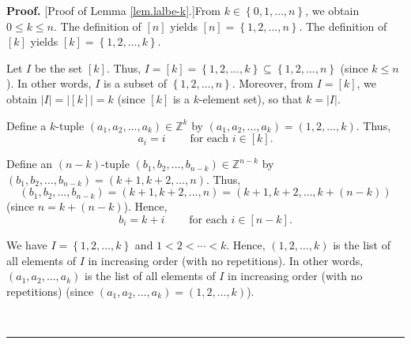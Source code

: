 \documentclass
[numbers=enddot,12pt,final,onecolumn,notitlepage,english]{scrartcl}%
\theoremstyle{definition}
\newenvironment{proof}[1][Proof]{\noindent\textbf{#1.} }{\ \rule{0.5em}{0.5em}}
\newenvironment{verlong}{}{}
\begin{document}
\begin{verlong}
\begin{proof}
[Proof of Lemma \ref{lem.lalbe-k}.]From $k\in\left\{  0,1,\ldots,n\right\}  $,
we obtain $0\leq k\leq n$. The definition of $\left[  n\right]  $ yields
$\left[  n\right]  =\left\{  1,2,\ldots,n\right\}  $. The definition of
$\left[  k\right]  $ yields $\left[  k\right]  =\left\{  1,2,\ldots,k\right\}
$.

Let $I$ be the set $\left[  k\right]  $. Thus, $I=\left[  k\right]  =\left\{
1,2,\ldots,k\right\}  \subseteq\left\{  1,2,\ldots,n\right\}  $ (since $k\leq
n$). In other words, $I$ is a subset of $\left\{  1,2,\ldots,n\right\}  $.
Moreover, from $I=\left[  k\right]  $, we obtain $\left\vert I\right\vert
=\left\vert \left[  k\right]  \right\vert =k$ (since $\left[  k\right]  $ is a
$k$-element set), so that $k=\left\vert I\right\vert $.

Define a $k$-tuple $\left(  a_{1},a_{2},\ldots,a_{k}\right)  \in\mathbb{Z}%
^{k}$ by $\left(  a_{1},a_{2},\ldots,a_{k}\right)  =\left(  1,2,\ldots
,k\right)  $. Thus,%
\begin{equation}
a_{i}=i\ \ \ \ \ \ \ \ \ \ \text{for each }i\in\left[  k\right]  .
\label{pf.lem.lalbe-k.ai=}%
\end{equation}


Define an $\left(  n-k\right)  $-tuple $\left(  b_{1},b_{2},\ldots
,b_{n-k}\right)  \in\mathbb{Z}^{n-k}$ by \newline$\left(  b_{1},b_{2}%
,\ldots,b_{n-k}\right)  =\left(  k+1,k+2,\ldots,n\right)  $. Thus,
\[
\left(  b_{1},b_{2},\ldots,b_{n-k}\right)  =\left(  k+1,k+2,\ldots,n\right)
=\left(  k+1,k+2,\ldots,k+\left(  n-k\right)  \right)
\]
(since $n=k+\left(  n-k\right)  $). Hence,%
\begin{equation}
b_{i}=k+i\ \ \ \ \ \ \ \ \ \ \text{for each }i\in\left[  n-k\right]  .
\label{pf.lem.lalbe-k.bi=}%
\end{equation}


We have $I=\left\{  1,2,\ldots,k\right\}  $ and $1<2<\cdots<k$. Hence,
$\left(  1,2,\ldots,k\right)  $ is the list of all elements of $I$ in
increasing order (with no repetitions). In other words, $\left(  a_{1}%
,a_{2},\ldots,a_{k}\right)  $ is the list of all elements of $I$ in increasing
order (with no repetitions) (since $\left(  a_{1},a_{2},\ldots,a_{k}\right)
=\left(  1,2,\ldots,k\right)  $).


\end{proof}
\end{verlong}
\end{document}
